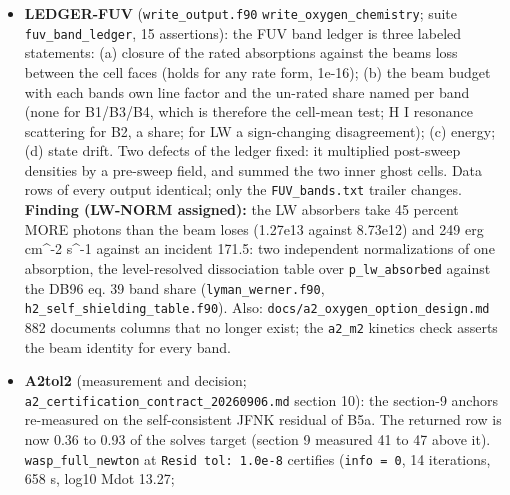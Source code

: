 \documentclass[english,a4paper]{my_memo}
\begin{document}
\begin{itemize}
  was a null \texttt{F0} argument of \texttt{jv\_product} in a \texttt{pgmres} clone the compiler
  had specialized for a null pointer, i.e. a defect of the source text of
  one intermediate build (13:08) between two edits of \texttt{steady\_newton.f90};
  every later build carries a plain \texttt{pgmres}, \texttt{HEAD} plus the rejected ghost
  rule completes \texttt{wasp\_full\_newton} three times, AddressSanitizer finds
  nothing over a full run. Correction to B4-4a\textquotesingle s premise: \texttt{-g} changes no
  generated code (\texttt{.text} bitwise identical at -O3 with and without it).
  Noted: at the time of the diagnosis the working tree stopped
  \texttt{wasp\_full\_newton} at step 0 on the energy floor (B3c in progress).
\item
  \textbf{LEDGER-FUV} (\texttt{write\_output.f90} \texttt{write\_oxygen\_chemistry}; suite
  \texttt{fuv\_band\_ledger}, 15 assertions): the FUV band ledger is three labeled
  statements: (a) closure of the rated absorptions against the beam\textquotesingle s loss
  between the cell faces (holds for any rate form, 1e-16); (b) the beam
  budget with each band\textquotesingle s own line factor and the un-rated share named per
  band (none for B1/B3/B4, which is therefore the cell-mean test; H I
  resonance scattering for B2, a share; for LW a sign-changing
  disagreement); (c) energy; (d) state drift. Two defects of the ledger
  fixed: it multiplied post-sweep densities by a pre-sweep field, and summed
  the two inner ghost cells. Data rows of every output identical; only the
  \texttt{FUV\_bands.txt} trailer changes. \textbf{Finding (LW-NORM assigned):} the LW
  absorbers take 45 percent MORE photons than the beam loses (1.27e13
  against 8.73e12) and 249 erg cm\^{}-2 s\^{}-1 against an incident 171.5: two
  independent normalizations of one absorption, the level-resolved
  dissociation table over \texttt{p\_lw\_absorbed} against the DB96 eq. 39 band
  share (\texttt{lyman\_werner.f90}, \texttt{h2\_self\_shielding\_table.f90}). Also:
  \texttt{docs/a2\_oxygen\_option\_design.md} 882 documents columns that no longer
  exist; the \texttt{a2\_m2} kinetics check asserts the beam identity for every band.
\item
  \textbf{A2tol2} (measurement and decision; \texttt{a2\_certification\_contract\_20260906.md}
  section 10): the section-9 anchors re-measured on the self-consistent JFNK
  residual of B5a. The returned row is now 0.36 to 0.93 of the solve\textquotesingle s target
  (section 9 measured 41 to 47 above it). \texttt{wasp\_full\_newton} at \texttt{Resid\ tol:\ 1.0e-8} certifies (\texttt{info\ =\ 0}, 14 iterations, 658 s, log10 Mdot 13.27;

\end{itemize}
\end{document}
